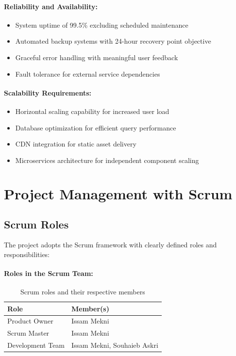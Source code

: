 \paragraph{Reliability and Availability:}
\begin{itemize}
    \item System uptime of 99.5\% excluding scheduled maintenance
    \item Automated backup systems with 24-hour recovery point objective
    \item Graceful error handling with meaningful user feedback
    \item Fault tolerance for external service dependencies
\end{itemize}

\paragraph{Scalability Requirements:}
\begin{itemize}
    \item Horizontal scaling capability for increased user load
    \item Database optimization for efficient query performance
    \item CDN integration for static asset delivery
    \item Microservices architecture for independent component scaling
\end{itemize}

\section{Project Management with Scrum}

\subsection{Scrum Roles}

The project adopts the Scrum framework with clearly defined roles and responsibilities:

\paragraph{Roles in the Scrum Team:}

\begin{table}[h!]
    \centering
    \begin{tabular}{|l|l|}
        \hline
        \textbf{Role}          & \textbf{Member(s)}             \\ \hline
        Product Owner          & Issam Mekni                   \\ \hline
        Scrum Master           & Issam Mekni                   \\ \hline
        Development Team       & Issam Mekni, Souhaieb Askri   \\ \hline
    \end{tabular}
    \caption{Scrum roles and their respective members}
\end{table}


